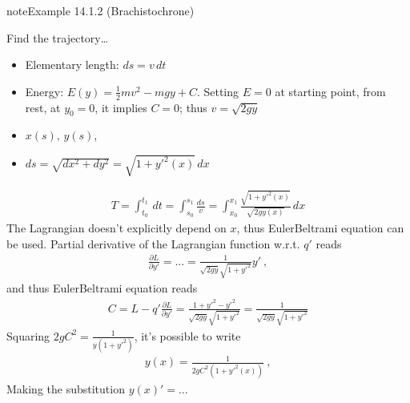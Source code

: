 \documentclass[letterpaper,10pt,english]{jupyterBook}
\begin{document}
\sphinxAtStartPar
{}
\label{ch/calculus-variations/intro:example-1}
\begin{sphinxadmonition}{note}{Example 14.1.2 (Brachistochrone)}



\sphinxAtStartPar
Find the trajectory…
\begin{itemize}
\item {} 
\sphinxAtStartPar
Elementary length: \(ds = v \, dt\)

\item {} 
\sphinxAtStartPar
Energy: \(E(y) = \frac{1}{2} m v^2 - m g y + C\). Setting \(E = 0\) at starting point, from rest, at \(y_0 = 0\), it implies \(C=0\); thus \(v = \sqrt{2gy}\)

\item {} 
\sphinxAtStartPar
\(x(s), \, y(s)\),

\item {} 
\sphinxAtStartPar
\(ds = \sqrt{dx^2 + dy^2} = \sqrt{1+y'^2(x)} \, dx\)

\end{itemize}
\begin{equation*}
\begin{split}T = \int_{t_0}^{t_1} \, dt = \int_{s_0}^{s_1} \frac{ds}{v} = \int_{x_0}^{x_1} \frac{\sqrt{1+y'^2(x)}}{\sqrt{2gy(x)}} \, dx\end{split}
\end{equation*}
\sphinxAtStartPar
The Lagrangian doesn’t explicitly depend on \(x\), thus Euler\sphinxhyphen{}Beltrami equation can be used. Partial derivative of the Lagrangian function w.r.t. \(q'\) reads
\begin{equation*}
\begin{split}\frac{\partial L}{\partial y'} = ... = \frac{1}{\sqrt{2 g y} \sqrt{1+y'^2}} y' \ ,\end{split}
\end{equation*}
\sphinxAtStartPar
and thus Euler\sphinxhyphen{}Beltrami equation reads
\begin{equation*}
\begin{split}C = L - q' \frac{\partial L}{\partial y'} = \frac{ 1 + y'^2 - y'^2}{\sqrt{2 g y} \sqrt{1+y'^2}} = \frac{1}{\sqrt{2 g y} \sqrt{1+y'^2}}\end{split}
\end{equation*}
\sphinxAtStartPar
Squaring \(2 g C^2 = \frac{1}{y(1+y'^2)}\), it’s possible to write
\begin{equation*}
\begin{split}y(x) = \frac{1}{2gC^2(1+y'^2(x))} \ ,\end{split}
\end{equation*}
\sphinxAtStartPar
Making the substitution \(y(x)' = \dots\)
\end{sphinxadmonition}
\end{document}
